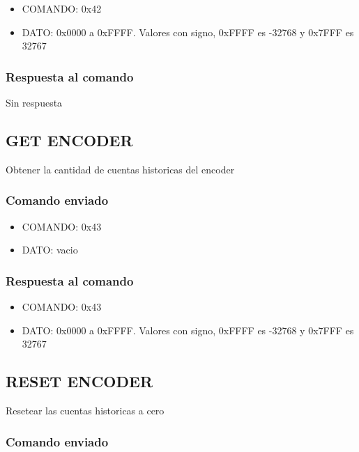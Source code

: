 \documentclass[a4paper,11pt]{article}
\begin{document}
\begin{itemize}
	\item{COMANDO:} 0x42
	\item{DATO:} 0x0000 a 0xFFFF. Valores con signo, 0xFFFF es -32768 y 0x7FFF es 32767
\end{itemize}

\subsubsection*{Respuesta al comando}
\label{set_encoder_respuesta}

Sin respuesta

\subsection{GET ENCODER}
\label{get_encoder}

Obtener la cantidad de cuentas historicas del encoder

\subsubsection*{Comando enviado}
\label{get_encoder_comando_enviado}

\begin{itemize}
	\item{COMANDO:} 0x43
	\item{DATO:} vacio
\end{itemize}

\subsubsection*{Respuesta al comando}
\label{get_encoder_respuesta}

\begin{itemize}
	\item{COMANDO:} 0x43
	\item{DATO:} 0x0000 a 0xFFFF. Valores con signo, 0xFFFF es -32768 y 0x7FFF es 32767
\end{itemize}

\subsection{RESET ENCODER}
\label{reset_encoder}

Resetear las cuentas historicas a cero

\subsubsection*{Comando enviado}
\label{reset_encoder_comando_enviado}
\end{document}
